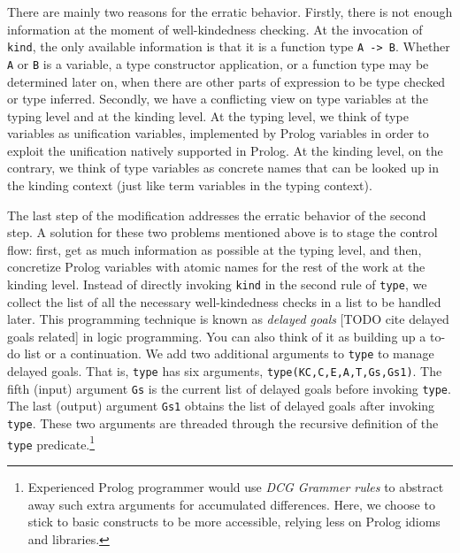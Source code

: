 \documentclass[runningheads,a4paper]{llncs}
\begin{document}
There are mainly two reasons for the erratic behavior.
Firstly, there is not enough information at the moment of
well-kindedness checking. At the invocation of \verb|kind|,
the only available information is that it is a function type \verb|A -> B|.
Whether \verb|A| or \verb|B| is a variable, a type constructor application,
or a function type may be determined later on, when there are other parts
of expression to be type checked or type inferred. Secondly, we have
a conflicting view on type variables at the typing level and
at the kinding level. At the typing level, we think of type variables as
unification variables, implemented by Prolog variables in order to exploit
the unification natively supported in Prolog. At the kinding level,
on the contrary, we think of type variables as concrete names that
can be looked up in the kinding context (just like term variables
in the typing context).

The last step of the modification addresses the erratic behavior of
the second step. A solution for these two problems mentioned above is
to stage the control flow: first, get as much information as possible
at the typing level, and then, concretize Prolog variables with atomic names
for the rest of the work at the kinding level. Instead of directly invoking
\verb|kind| in the second rule of \verb|type|, we collect the list of
all the necessary well-kindedness checks in a list to be handled later.
This programming technique is known as \emph{delayed goals}
[TODO cite delayed goals related] in logic programming.
You can also think of it as building up a to-do list or a continuation.
We add two additional arguments to \verb|type| to manage delayed goals.
That is, \verb|type| has six arguments, \verb|type(KC,C,E,A,T,Gs,Gs1)|.
The fifth (input) argument \verb|Gs| is the current list of delayed goals
before invoking \verb|type|. The last (output) argument \verb|Gs1| obtains
the list of delayed goals after invoking \verb|type|. These two arguments
are threaded through the recursive definition of
the \verb|type| predicate.\footnote{
  Experienced Prolog programmer would use
  \emph{DCG Grammer rules} \cite{SWIPrologManual} to abstract away
  such extra arguments for accumulated differences.
  Here, we choose to stick to basic constructs to be more accessible,
  relying less on Prolog idioms and libraries.}
\end{document}
